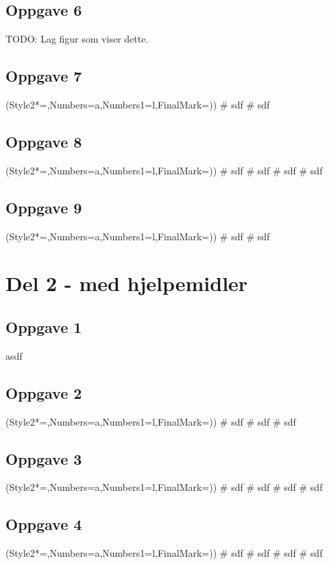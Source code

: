 \subsection*{Oppgave 6}
TODO: Lag figur som viser dette.

\subsection*{Oppgave 7}
\begin{easylist}[enumerate]
	\ListProperties(Style2*=,Numbers=a,Numbers1=l,FinalMark={)})
	# sdf
	# sdf
\end{easylist}

\subsection*{Oppgave 8}
\begin{easylist}[enumerate]
	\ListProperties(Style2*=,Numbers=a,Numbers1=l,FinalMark={)})
	# sdf
	# sdf
	# sdf
	# sdf
\end{easylist}

\subsection*{Oppgave 9}
\begin{easylist}[enumerate]
	\ListProperties(Style2*=,Numbers=a,Numbers1=l,FinalMark={)})
	# sdf
	# sdf
\end{easylist}





\section*{Del 2 - med hjelpemidler}


\subsection*{Oppgave 1}
asdf

\subsection*{Oppgave 2}
\begin{easylist}[enumerate]
	\ListProperties(Style2*=,Numbers=a,Numbers1=l,FinalMark={)})
	# sdf
	# sdf
	# sdf
\end{easylist}


\subsection*{Oppgave 3}
\begin{easylist}[enumerate]
	\ListProperties(Style2*=,Numbers=a,Numbers1=l,FinalMark={)})
	# sdf
	# sdf
	# sdf
	# sdf
\end{easylist}

\subsection*{Oppgave 4}
\begin{easylist}[enumerate]
	\ListProperties(Style2*=,Numbers=a,Numbers1=l,FinalMark={)})
	# sdf
	# sdf
	# sdf
	# sdf
\end{easylist}




